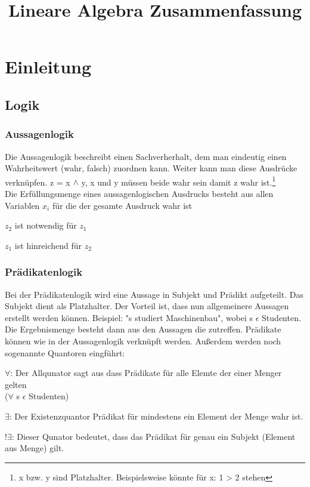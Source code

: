 \documentclass[a4paper,10pt]{scrartcl}
\title{Lineare Algebra Zusammenfassung }
\author{}
\begin{document}
    \maketitle
    \newpage
    \tableofcontents
    \newpage
    \section{Einleitung}
        \subsection{Logik}

        \subsubsection{Aussagenlogik}
        Die Aussagenlogik beschreibt einen Sachverherhalt, dem man eindeutig einen 
        Wahrheitswert (wahr, falsch) zuordnen kann. Weiter kann man diese Ausdrücke verknüpfen. 
        z = x $\wedge$ y, x und y müssen beide wahr sein damit z wahr ist.\footnote{x bzw. y sind Platzhalter. Beispielsweise könnte für x: 1 > 2 stehen} \\
        Die Erfüllungsmenge eines aussagenlogischen Ausdrucks besteht aus allen Variablen $x_i$ für die der gesamte Ausdruck wahr ist
        \begin{description}
            \item[$z_1 \Rightarrow z_2$]
            \item $z_2$ ist notwendig für $z_1$ 
            \item $z_1$ ist hinreichend für $z_2$
        \end{description}

        \subsubsection{Prädikatenlogik}
        Bei der Prädikatenlogik wird eine Aussage in Subjekt und Prädikt aufgeteilt. Das Subjekt dient als Platzhalter. Der Vorteil ist, dass nun 
        allgemeinere Aussagen erstellt werden können. Beispiel: "s studiert Maschinenbau", wobei s $\epsilon$ Studenten. \\
        Die Ergebnismenge besteht dann aus den Aussagen die zutreffen. Prädikate können wie in der Aussagenlogik verknüpft werden. Außerdem werden noch sogenannte
        Quantoren eingführt:
        \begin{description}
            \item $\forall$: Der Allqunator sagt aus dass  Prädikate für alle Elemte der einer Menger gelten \\($\forall$ s $\epsilon$ Studenten)
            \item $\exists$: Der Existenzquantor Prädikat für mindestens ein Element der Menge wahr ist.
            \item $!\exists$: Dieser Qunator bedeutet, dass das Prädikat für genau ein Subjekt (Element aus Menge) gilt.
        \end{description} 
\end{document}

